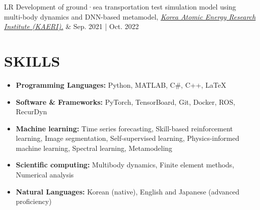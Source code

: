 \documentclass[a4paper,10pt]{extarticle}
\begin{document}
\begin{longtable}{LR}
	Development of ground·sea transportation test simulation model using multi-body dynamics and DNN-based metamodel, \href{https://www.kaeri.re.kr/eng/}{\textit{Korea Atomic Energy Research Institute (KAERI).}}                                     & {Sep. 2021 | Oct. 2022} \\
\end{longtable}

\section*{SKILLS}
\begin{itemize}
	\item \textbf{Programming Languages: }Python, MATLAB, C\#, C++, \LaTeX
	\item \textbf{Software \& Frameworks: }PyTorch, TensorBoard, Git, Docker, ROS, RecurDyn
	\item \textbf{Machine learning: }Time series forecasting, Skill-based reinforcement learning, Image segmentation, Self-supervised learning, Physics-informed machine learning, Spectral learning, Metamodeling
	\item \textbf{Scientific computing: }Multibody dynamics, Finite element methods, Numerical analysis
	\item \textbf{Natural Languages: }Korean (native), English and Japanese (advanced proficiency)
\end{itemize}
\end{document}
